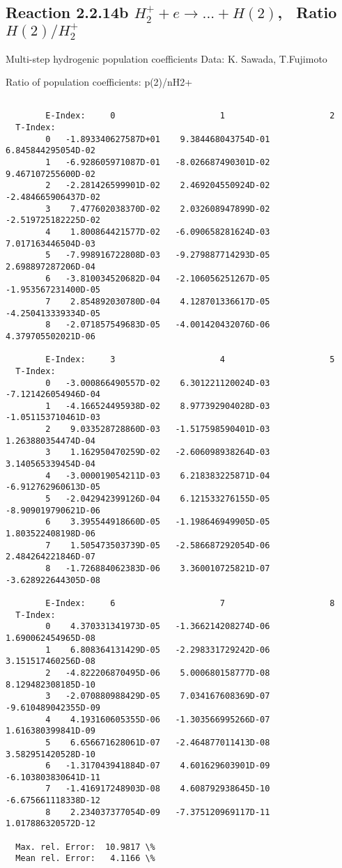 \documentclass[12pt,dvipdfmx]{article}
\begin{document}
\subsection{
Reaction 2.2.14b $ H_2^+ + e \rightarrow ...+ H(2) $, \  Ratio $H(2)/H_2^+  $
}

 Multi-step hydrogenic population coefficients
 Data: K. Sawada, T.Fujimoto \cite{kn:Sawada}

 Ratio of population coefficients: p(2)/nH2+

\begin{small}\begin{verbatim}

        E-Index:     0                     1                     2
  T-Index:
        0   -1.893340627587D+01    9.384468043754D-01    6.845844295054D-02
        1   -6.928605971087D-01   -8.026687490301D-02    9.467107255600D-02
        2   -2.281426599901D-02    2.469204550924D-02   -2.484665906437D-02
        3    7.477602038370D-02    2.032608947899D-02   -2.519725182225D-02
        4    1.800864421577D-02   -6.090658281624D-03    7.017163446504D-03
        5   -7.998916722808D-03   -9.279887714293D-05    2.698897287206D-04
        6   -3.810034520682D-04   -2.106056251267D-05   -1.953567231400D-05
        7    2.854892030780D-04    4.128701336617D-05   -4.250413339334D-05
        8   -2.071857549683D-05   -4.001420432076D-06    4.379705502021D-06

        E-Index:     3                     4                     5
  T-Index:
        0   -3.000866490557D-02    6.301221120024D-03   -7.121426054946D-04
        1   -4.166524495938D-02    8.977392904028D-03   -1.051153710461D-03
        2    9.033528728860D-03   -1.517598590401D-03    1.263880354474D-04
        3    1.162950470259D-02   -2.606098938264D-03    3.140565339454D-04
        4   -3.000019054211D-03    6.218383225871D-04   -6.912762960613D-05
        5   -2.042942399126D-04    6.121533276155D-05   -8.909019790621D-06
        6    3.395544918660D-05   -1.198646949905D-05    1.803522408198D-06
        7    1.505473503739D-05   -2.586687292054D-06    2.484264221846D-07
        8   -1.726884062383D-06    3.360010725821D-07   -3.628922644305D-08

        E-Index:     6                     7                     8
  T-Index:
        0    4.370331341973D-05   -1.366214208274D-06    1.690062454965D-08
        1    6.808364131429D-05   -2.298331729242D-06    3.151517460256D-08
        2   -4.822206870495D-06    5.000680158777D-08    8.129482308185D-10
        3   -2.070880988429D-05    7.034167608369D-07   -9.610489042355D-09
        4    4.193160605355D-06   -1.303566995266D-07    1.616380399841D-09
        5    6.656671628061D-07   -2.464877011413D-08    3.582951420528D-10
        6   -1.317043941884D-07    4.601629603901D-09   -6.103803830641D-11
        7   -1.416917248903D-08    4.608792938645D-10   -6.675661118338D-12
        8    2.234037377054D-09   -7.375120969117D-11    1.017886320572D-12

  Max. rel. Error:  10.9817 \%
  Mean rel. Error:   4.1166 \%


\end{verbatim}\end{small}
\end{document}
